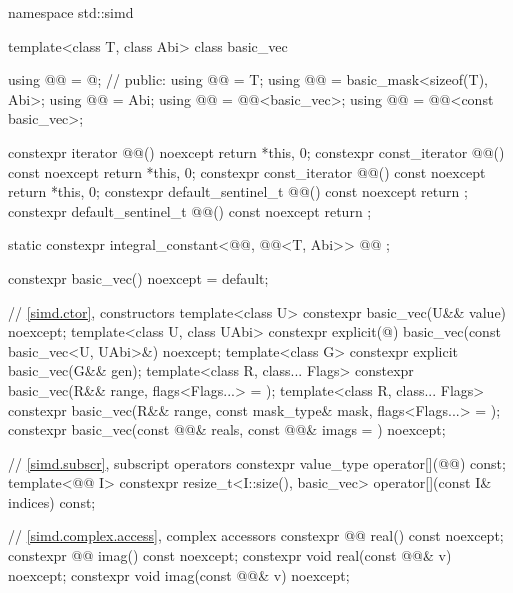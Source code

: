 %
\begin{codeblock}
namespace std::simd {
  template<class T, class Abi> class basic_vec {
    using @@ = @\seebelow@;                // \expos
  public:
    using @@ = T;
    using @@ = basic_mask<sizeof(T), Abi>;
    using @@ = Abi;
    using @@ = @@<basic_vec>;
    using @@ = @@<const basic_vec>;

    constexpr iterator @@() noexcept { return {*this, 0}; }
    constexpr const_iterator @@() const noexcept { return {*this, 0}; }
    constexpr const_iterator @@() const noexcept { return {*this, 0}; }
    constexpr default_sentinel_t @@() const noexcept { return {}; }
    constexpr default_sentinel_t @@() const noexcept { return {}; }

    static constexpr integral_constant<@@, @@<T, Abi>> @@ {};

    constexpr basic_vec() noexcept = default;

    // \ref{simd.ctor},  constructors
    template<class U>
      constexpr basic_vec(U&& value) noexcept;
    template<class U, class UAbi>
      constexpr explicit(@\seebelow@) basic_vec(const basic_vec<U, UAbi>&) noexcept;
    template<class G>
      constexpr explicit basic_vec(G&& gen);
    template<class R, class... Flags>
      constexpr basic_vec(R&& range, flags<Flags...> = {});
    template<class R, class... Flags>
      constexpr basic_vec(R&& range, const mask_type& mask, flags<Flags...> = {});
    constexpr basic_vec(const @@& reals, const @@& imags = {}) noexcept;

    // \ref{simd.subscr},  subscript operators
    constexpr value_type operator[](@@) const;
    template<@@ I>
      constexpr resize_t<I::size(), basic_vec> operator[](const I& indices) const;

    // \ref{simd.complex.access},  complex accessors
    constexpr @@ real() const noexcept;
    constexpr @@ imag() const noexcept;
    constexpr void real(const @@& v) noexcept;
    constexpr void imag(const @@& v) noexcept;

}}
\end{codeblock}
